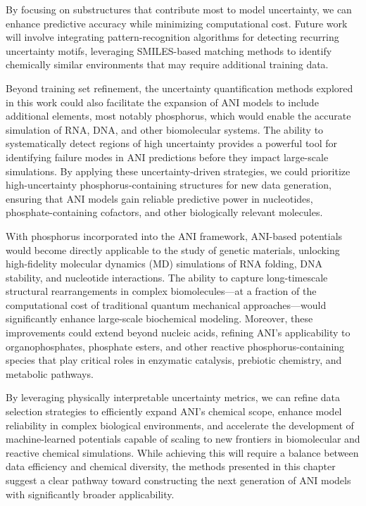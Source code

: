 By focusing on substructures that contribute most to model uncertainty, we can enhance predictive accuracy while minimizing computational cost. Future work will involve integrating pattern-recognition algorithms for detecting recurring uncertainty motifs, leveraging SMILES-based matching methods \cite{SMILES_pair_encoding_li} to identify chemically similar environments that may require additional training data. 



Beyond training set refinement, the uncertainty quantification methods explored in this work could also facilitate the expansion of ANI models to include additional elements, most notably phosphorus, which would enable the accurate simulation of RNA, DNA, and other biomolecular systems. The ability to systematically detect regions of high uncertainty provides a powerful tool for identifying failure modes in ANI predictions before they impact large-scale simulations. By applying these uncertainty-driven strategies, we could prioritize high-uncertainty phosphorus-containing structures for new data generation, ensuring that ANI models gain reliable predictive power in nucleotides, phosphate-containing cofactors, and other biologically relevant molecules.

With phosphorus incorporated into the ANI framework, ANI-based potentials would become directly applicable to the study of genetic materials, unlocking high-fidelity molecular dynamics (MD) simulations of RNA folding, DNA stability, and nucleotide interactions. The ability to capture long-timescale structural rearrangements in complex biomolecules—at a fraction of the computational cost of traditional quantum mechanical approaches—would significantly enhance large-scale biochemical modeling. Moreover, these improvements could extend beyond nucleic acids, refining ANI’s applicability to organophosphates, phosphate esters, and other reactive phosphorus-containing species that play critical roles in enzymatic catalysis, prebiotic chemistry, and metabolic pathways.

By leveraging physically interpretable uncertainty metrics, we can refine data selection strategies to efficiently expand ANI's chemical scope, enhance model reliability in complex biological environments, and accelerate the development of machine-learned potentials capable of scaling to new frontiers in biomolecular and reactive chemical simulations. While achieving this will require a balance between data efficiency and chemical diversity, the methods presented in this chapter suggest a clear pathway toward constructing the next generation of ANI models with significantly broader applicability.